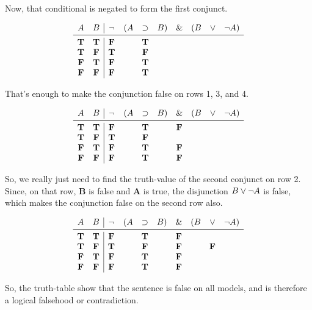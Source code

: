 \documentclass[../logic-text.tex]{subfiles}
\begin{document}
Now, that conditional is negated to form the first conjunct.

\[
  \begin{array}{cc|cccccccc}
    A & B & \lneg & (A & \lif & B) & \land & (B & \lor & \lneg A) \\ \midrule
    \true & \true & \false && \true &&&&& \\
    \true & \false & \true && \false &&&&& \\
    \false & \true & \false && \true &&&&& \\
    \false & \false & \false && \true &&&&& \\
  \end{array}
\]

That's enough to make the conjunction false on rows 1, 3, and 4.

\[
  \begin{array}{cc|cccccccc}
    A & B & \lneg & (A & \lif & B) & \land & (B & \lor & \lneg A) \\ \midrule
    \true & \true & \false && \true && \false &&& \\
    \true & \false & \true && \false &&&&& \\
    \false & \true & \false && \true && \false &&& \\
    \false & \false & \false && \true && \false &&& \\
  \end{array}
\]


So, we really just need to find the truth-value of the second conjunct on row 2.
Since, on that row, \textbf{B} is false and \textbf{A} is true, the disjunction \(B \lor \neg A\) is false, which makes the conjunction false on the second row also.

\[
  \begin{array}{cc|cccccccc}
    A & B & \lneg & (A & \lif & B) & \land & (B & \lor & \lneg A) \\ \midrule
    \true & \true & \false && \true && \false &&& \\
    \true & \false & \true && \false && \false && \false & \\
    \false & \true & \false && \true && \false &&& \\
    \false & \false & \false && \true && \false &&& \\
  \end{array}
\]

So, the truth-table show that the sentence is false on all models, and is therefore a logical falsehood or contradiction.
\end{document}
